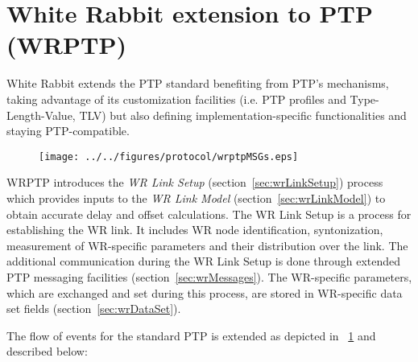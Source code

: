 \section{White Rabbit extension to PTP (WRPTP)}
\label{sec:wrptp}

White Rabbit extends the PTP standard benefiting from PTP's mechanisms, 
taking advantage of its customization facilities (i.e. PTP profiles
and Type-Length-Value, TLV) but also defining implementation-specific 
functionalities and staying PTP-compatible. 


\begin{figure}[!t]
\centering
\texttt{[image: ../../figures/protocol/wrptpMSGs.eps]}
\caption{}
\label{fig:wrptpMSGs}
\end{figure}

WRPTP introduces the \textit{WR Link Setup} (section~\ref{sec:wrLinkSetup}) process which
provides inputs to the \textit{WR Link  Model} (section~\ref{sec:wrLinkModel}) 
to obtain accurate delay and offset calculations. 
The WR Link Setup is a process for establishing the WR link. It includes WR node
identification, syntonization, measurement of WR-specific parameters and 
their distribution over the link. The additional communication during the WR Link Setup 
is done through extended PTP messaging facilities (section~\ref{sec:wrMessages}). 
The WR-specific parameters, which are exchanged and set during this process, are 
stored in WR-specific data set fields (section~\ref{sec:wrDataSet}). 

The flow of events for the standard PTP is extended as depicted in \figurename~\ref{fig:wrptpMSGs}
and described below:

